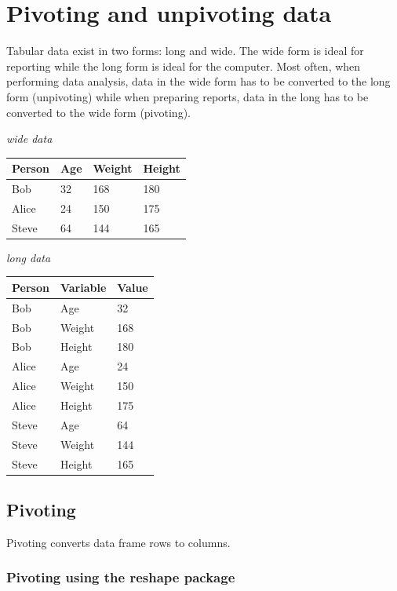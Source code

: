 \documentclass[
]{book}
\begin{document}
\hypertarget{pivoting-and-unpivoting-data}{%
\section{Pivoting and unpivoting data}\label{pivoting-and-unpivoting-data}}

Tabular data exist in two forms: long and wide. The wide form is ideal for reporting while the long form is ideal for the computer. Most often, when performing data analysis, data in the wide form has to be converted to the long form (unpivoting) while when preparing reports, data in the long has to be converted to the wide form (pivoting).

\emph{wide data}

\begin{longtable}[]{@{}llll@{}}
\toprule
Person & Age & Weight & Height \\
\midrule
\endhead
Bob & 32 & 168 & 180 \\
Alice & 24 & 150 & 175 \\
Steve & 64 & 144 & 165 \\
\bottomrule
\end{longtable}

\emph{long data}

\begin{longtable}[]{@{}lll@{}}
\toprule
Person & Variable & Value \\
\midrule
\endhead
Bob & Age & 32 \\
Bob & Weight & 168 \\
Bob & Height & 180 \\
Alice & Age & 24 \\
Alice & Weight & 150 \\
Alice & Height & 175 \\
Steve & Age & 64 \\
Steve & Weight & 144 \\
Steve & Height & 165 \\
\bottomrule
\end{longtable}

\hypertarget{pivoting}{%
\subsection{Pivoting}\label{pivoting}}

Pivoting converts data frame rows to columns.

\hypertarget{pivoting-using-the-reshape-package}{%
\subsubsection{\texorpdfstring{Pivoting using the \textbf{reshape} package}{Pivoting using the reshape package}}\label{pivoting-using-the-reshape-package}}
\end{document}

